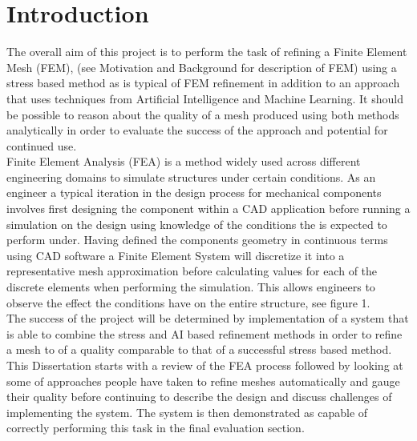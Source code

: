 \section{Introduction}

The overall aim of this project is to perform the task of refining a Finite Element Mesh (FEM), (see Motivation and Background for description of FEM) using a stress based method as is typical of FEM refinement in addition to an approach that uses techniques from Artificial Intelligence and Machine Learning. It should be possible to reason about the quality of a mesh produced using both methods analytically in order to evaluate the success of the approach and potential for continued use.\\

\noindent
Finite Element Analysis (FEA) is a method widely used across different engineering domains to simulate structures under certain conditions. As an engineer a typical iteration in the design process for mechanical components involves first designing the component within a CAD application before running a simulation on the design using knowledge of the conditions the is expected to perform under. Having defined the components geometry in continuous terms using CAD software a Finite Element System will discretize it into a representative mesh approximation before calculating values for each of the discrete elements when performing the simulation. This allows engineers to observe the effect the conditions have on the entire structure, see figure 1. \\ 

\noindent
The success of the project will be determined by implementation of a system that is able to combine the stress and AI based refinement methods in order to refine a mesh to of a quality comparable to that of a successful stress based method. \\ 

\noindent
This Dissertation starts with a review of the FEA process followed by looking at some of approaches people have taken to refine meshes automatically and gauge their quality before continuing to describe the design and discuss challenges of implementing the system. The system is then demonstrated as capable of correctly performing this task in the final evaluation section. \\